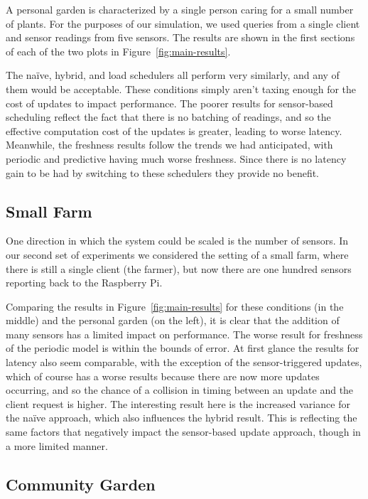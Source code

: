 \documentclass[a4paper]{acm_proc_article-sp}
\makeatletter
\newcommand{\naive}{na\"{i}ve\@\xspace}
\makeatother
\begin{document}
A personal garden is characterized by a single person caring for a small number of plants.  For the purposes of our simulation, we used queries from a single client and sensor readings from five sensors.  The results are shown in the first sections of each of the two plots in Figure~\ref{fig:main-results}.

The \naive, hybrid, and load schedulers all perform very similarly, and any of them would be acceptable.  These conditions simply aren't taxing enough for the cost of updates to impact performance.  The poorer results for sensor-based scheduling reflect the fact that there is no batching of readings, and so the effective computation cost of the updates is greater, leading to worse latency.  Meanwhile, the freshness results follow the trends we had anticipated, with periodic and predictive having much worse freshness.  Since there is no latency gain to be had by switching to these schedulers they provide no benefit.

\subsection{Small Farm}

One direction in which the system could be scaled is the number of sensors.  In our second set of experiments we considered the setting of a small farm, where there is still a single client (the farmer), but now there are one hundred sensors reporting back to the Raspberry Pi.

Comparing the results in Figure~\ref{fig:main-results} for these conditions (in the middle) and the personal garden (on the left), it is clear that the addition of many sensors has a limited impact on performance.  The worse result for freshness of the periodic model is within the bounds of error.  At first glance the results for latency also seem comparable, with the exception of the sensor-triggered updates, which of course has a worse results because there are now more updates occurring, and so the chance of a collision in timing between an update and the client request is higher.  The interesting result here is the increased variance for the \naive approach, which also influences the hybrid result.  This is reflecting the same factors that negatively impact the sensor-based update approach, though in a more limited manner.

\subsection{Community Garden}
\end{document}
